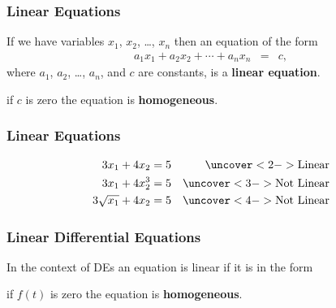 \begin{frame}
  \frametitle{Linear Equations}

  If we have variables $x_1$, $x_2$, \ldots, $x_n$ then an equation of
  the form
  \begin{eqnarray*}
    a_1 x_1 + a_2 x_2 + \cdots + a_n x_n & = & c,
  \end{eqnarray*}
  where $a_1$, $a_2$, \ldots, $a_n$, and $c$ are constants, is a
  \textbf{linear equation}.

  if $c$ is zero the equation is \textbf{homogeneous}.

\end{frame}


\begin{frame}
  \frametitle{Linear Equations}

  \begin{eqnarray*}
    3 x_1 + 4 x_2 = 5 & & \uncover<2->{\mathrm{Linear}} \\
    3 x_1 + 4 x^3_2 = 5 & & \uncover<3->{\mathrm{Not~Linear}} \\
    3 \sqrt{x_1} + 4 x_2 = 5 & & \uncover<4->{\mathrm{Not~Linear}} \\
  \end{eqnarray*}


\end{frame}


\begin{frame}
  \frametitle{Linear Differential Equations}

  In the context of DEs an equation is linear if it is in the form

  if $f(t)$ is zero the equation is \textbf{homogeneous}.

\end{frame}


